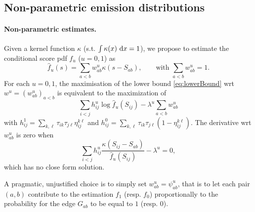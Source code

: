 \subsection{Non-parametric emission distributions} \label{sec:np}

\paragraph{Non-parametric estimates.}
Given a kernel function $\kappa$ (s.t. $\int \kappa(x) \d x = 1$), we propose to estimate the conditional score pdf $f_u$ ($u = 0, 1$) as
$$
\widehat{f}_u(s) = \sum_{a < b} w_{ab}^u \kappa(s - S_{ab}), 
\qquad \text{with } \sum_{a < b} w_{ab}^u  = 1.
$$
For each $u = 0, 1$, the maximisation of the lower bound \eqref{eq:lowerBound} wrt $w^u = (w^u_{ab})_{a < b}$ is equivalent to the maximization of
$$
\sum_{i < j} h^u_{ij} \log \widehat{f}_u(S_{ij}) - \lambda^u \sum_{a < b} w_{ab}^u
$$
with
$h^1_{ij} = \sum_{k, \ell} \tau_{ik} \tau_{j\ell} \eta^{k\ell}_{ij}$ and $h^0_{ij} = \sum_{k, \ell} \tau_{ik} \tau_{j\ell} (1 - \eta^{k\ell}_{ij})$. The derivative wrt $w^u_{ab}$ is zero when
$$
\sum_{i < j} h^u_{ij} \frac{\kappa(S_{ij} - S_{ab})}{\widehat{f}_u(S_{ij})} - \lambda^u = 0,
$$
which has no close form solution. 

A pragmatic, unjustified choice is to simply set $w^u_{ab} = \psi^u_{ab}$, that is to let each pair $(a, b)$ contribute to the estimation $f_1$ (resp. $f_0$) proportionally to the probability for the edge $G_{ab}$ to be equal to $1$ (resp. $0$).
